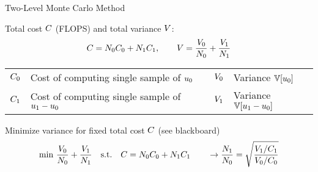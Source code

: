 \begin{frame}{Two-Level Monte Carlo Method}
    \begin{squarelist}
        \item<1-> Total cost $C$ (FLOPS) and total variance $V$:
        \begin{equation*}
            C = N_0C_0 + N_1C_1, \qquad V = \frac{V_0}{N_0} + \frac{V_1}{N_1}
        \end{equation*}
        \vspace{-1.5em}
        \begin{block}{}
            \begin{centering}
                \begin{tabular}{r|lcr|l}
                    $C_0$ & Cost of computing single sample of $u_0$ & &
                    $V_0$ & Variance $\mathbb{V}[u_0]$ \\
                    $C_1$ & Cost of computing single sample of $u_1-u_0$ & &
                    $V_1$ & Variance $\mathbb{V}[u_1 - u_0]$ 
                \end{tabular}
            \end{centering}
        \end{block}
        \vspace{0.5em}
        \item<2-> Minimize variance for fixed total cost $C$ (see blackboard)
            \begin{equation*}
                \min\, \frac{V_0}{N_0} + \frac{V_1}{N_1} \quad \text{s.t.} \quad C = N_0C_0 + N_1C_1 \qquad \rightarrow \frac{N_1}{N_0} = \sqrt{\frac{V_1/C_1}{V_0/C_0}}
            \end{equation*}
    \end{squarelist}
\end{frame}

